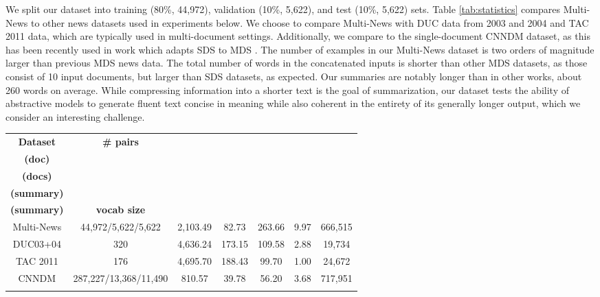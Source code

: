\documentclass[11pt,a4paper]{article}
\begin{document}
We split our dataset into training (80\%,
44,972), validation (10\%, 5,622), and test (10\%,
5,622) sets. Table \ref{tab:statistics} compares Multi-News to other news datasets used in experiments below. We choose to compare Multi-News with DUC data from 2003 and 2004 and TAC 2011 data, which are typically used in multi-document settings. Additionally, we compare to the single-document CNNDM dataset, as this has been recently used in work which adapts SDS to MDS \cite{lebanoff18mds}. The number of examples in our Multi-News dataset is two orders of magnitude larger than previous MDS news data. The total number of words in the concatenated inputs is shorter than other MDS datasets, as those consist of 10 input documents, but larger than SDS datasets, as expected. Our summaries are notably longer than in other works, about 260 words on average. While compressing information into a shorter text is the goal of summarization, our dataset tests the ability of abstractive models to generate fluent text concise in meaning while also coherent in the entirety of its generally longer output, which we consider an interesting challenge. 
\begin{table*}[t]
\centering
\small
\begin{tabular}{c c c c c c c} \Xhline{2\arrayrulewidth}
             \textbf{Dataset} & \textbf{\# pairs} & \specialcell{\textbf{\# words} \\\textbf{(doc)}} & \specialcell{\textbf{\# sents} \\\textbf{(docs)}} & \specialcell{\textbf{\# words} \\\textbf{(summary)}} &  \specialcell{\textbf{\# sents} \\\textbf{(summary)}} & \textbf{vocab size} \\ \Xhline{\arrayrulewidth}
             Multi-News & 44,972/5,622/5,622 & 2,103.49 & 82.73 & 263.66 & 9.97 &666,515 \\ DUC03+04 & 320 & 4,636.24 & 173.15 & 109.58 & 2.88 & 19,734 \\ TAC 2011 & 176 & 4,695.70 & 188.43  & 99.70 & 1.00 &24,672 \\ CNNDM & 287,227/13,368/11,490 & 810.57 & 39.78  & 56.20 & 3.68 &717,951 \\ \Xhline{2\arrayrulewidth}
\end{tabular}
\caption{Comparison of our Multi-News dataset to other MDS datasets as well as an SDS dataset used as training data for MDS (CNNDM). Training, validation and testing size splits (article(s) to summary) are provided when applicable. Statistics for multi-document inputs are calculated on the concatenation of all input sources.}
\label{tab:statistics}
\end{table*}
\end{document}
